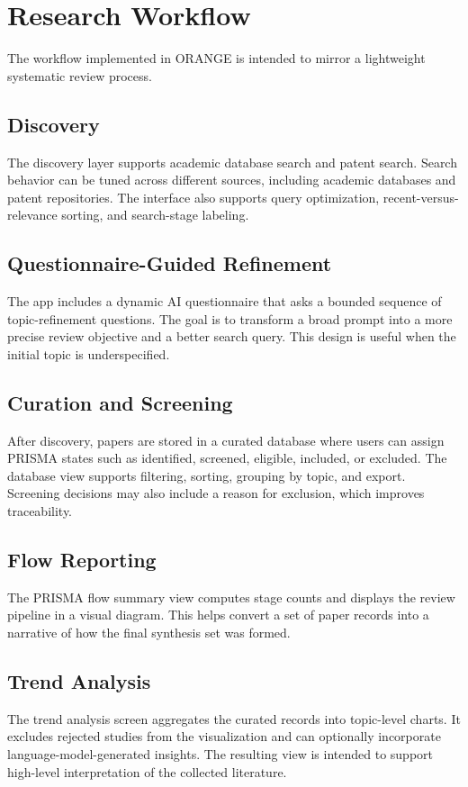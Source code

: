 \documentclass[11pt,a4paper]{article}
\begin{document}
\section{Research Workflow}
The workflow implemented in ORANGE is intended to mirror a lightweight systematic review process.

\subsection{Discovery}
The discovery layer supports academic database search and patent search. Search behavior can be tuned across different sources, including academic databases and patent repositories. The interface also supports query optimization, recent-versus-relevance sorting, and search-stage labeling.

\subsection{Questionnaire-Guided Refinement}
The app includes a dynamic AI questionnaire that asks a bounded sequence of topic-refinement questions. The goal is to transform a broad prompt into a more precise review objective and a better search query. This design is useful when the initial topic is underspecified.

\subsection{Curation and Screening}
After discovery, papers are stored in a curated database where users can assign PRISMA states such as identified, screened, eligible, included, or excluded. The database view supports filtering, sorting, grouping by topic, and export. Screening decisions may also include a reason for exclusion, which improves traceability.

\subsection{Flow Reporting}
The PRISMA flow summary view computes stage counts and displays the review pipeline in a visual diagram. This helps convert a set of paper records into a narrative of how the final synthesis set was formed.

\subsection{Trend Analysis}
The trend analysis screen aggregates the curated records into topic-level charts. It excludes rejected studies from the visualization and can optionally incorporate language-model-generated insights. The resulting view is intended to support high-level interpretation of the collected literature.
\end{document}
